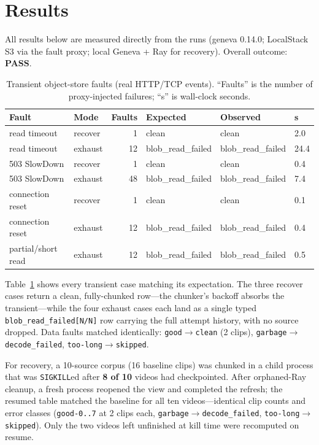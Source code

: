 \documentclass[11pt]{article}
\newcommand{\ct}[1]{\texttt{\small #1}}
\begin{document}
\section{Results}

All results below are measured directly from the runs (geneva 0.14.0; LocalStack
S3 via the fault proxy; local Geneva + Ray for recovery). Overall outcome:
\textbf{PASS}.

\begin{table}[t]
\centering
\caption{Transient object-store faults (real HTTP/TCP events). ``Faults'' is the
number of proxy-injected failures; ``s'' is wall-clock seconds.}
\label{tab:transient}
\small
\begin{tabular}{@{}llrlll@{}}
\toprule
\textbf{Fault} & \textbf{Mode} & \textbf{Faults} & \textbf{Expected} & \textbf{Observed} & \textbf{s} \\
\midrule
read timeout        & recover & 1  & clean            & clean            & 2.0 \\
read timeout        & exhaust & 12 & blob\_read\_failed & blob\_read\_failed & 24.4 \\
503 SlowDown        & recover & 1  & clean            & clean            & 0.4 \\
503 SlowDown        & exhaust & 48 & blob\_read\_failed & blob\_read\_failed & 7.4 \\
connection reset    & recover & 1  & clean            & clean            & 0.1 \\
connection reset    & exhaust & 12 & blob\_read\_failed & blob\_read\_failed & 0.4 \\
partial/short read  & exhaust & 12 & blob\_read\_failed & blob\_read\_failed & 0.5 \\
\bottomrule
\end{tabular}
\end{table}

Table~\ref{tab:transient} shows every transient case matching its expectation.
The three recover cases return a clean, fully-chunked row---the chunker's backoff
absorbs the transient---while the four exhaust cases each land as a single typed
\ct{blob\_read\_failed[N/N]} row carrying the full attempt history, with no source
dropped. Data faults matched identically: \ct{good}$\to$\ct{clean} (2 clips),
\ct{garbage}$\to$\ct{decode\_failed}, \ct{too-long}$\to$\ct{skipped}.

For recovery, a 10-source corpus (16 baseline clips) was chunked in a child
process that was \ct{SIGKILL}ed after \textbf{8 of 10} videos had checkpointed.
After orphaned-Ray cleanup, a fresh process reopened the view and completed the
refresh; the resumed table matched the baseline for all ten videos---identical
clip counts and error classes (\ct{good-0..7} at 2 clips each,
\ct{garbage}$\to$\ct{decode\_failed}, \ct{too-long}$\to$\ct{skipped}). Only the
two videos left unfinished at kill time were recomputed on resume.
\end{document}
